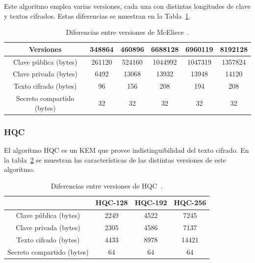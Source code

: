 Este algoritmo emplea varias versiones, cada una con distintas longitudes de clave y textos cifrados.
Estas diferencias se muestran en la Tabla~\ref{tab:mceliece}. 

\begin{table}[H]
    \centering
    \begin{tabular}{|c|c|c|c|c|c|}
    \hline
    Versiones                   & \textbf{348864}  & \textbf{460896}  & \textbf{6688128} & \textbf{6960119} & \textbf{8192128} \\ \hline
    Clave pública (bytes)       & 261120                    & 524160                    & 1044992                   & 1047319                   & 1357824                   \\ \hline
    Clave privada (bytes)       & 6492                      & 13068                     & 13932                     & 13948                     & 14120                     \\ \hline
    Texto cifrado (bytes)       & 96                        & 156                       & 208                       & 194                       & 208                       \\ \hline
    Secreto compartido (bytes)  & 32                        & 32                        & 32                        & 32                        & 32                        \\ \hline
    \end{tabular}
    \caption{Diferencias entre versiones de McEliece~\cite{mceliece_spec}.}
    \label{tab:mceliece}
\end{table}


\subsubsection{HQC}\label{subsubsec:hqc}

El algoritmo HQC es un \ac{KEM} que provee indistinguibilidad del texto cifrado.
En la tabla~\ref{tab:hqc} se muestran las características de las distintas versiones de este algoritmo.

\begin{table}[H]
    \centering
    \begin{tabular}{|c|c|c|c|}
    \hline
                                & \textbf{HQC-128}      & \textbf{HQC-192}      & \textbf{HQC-256}   \\ \hline
    Clave pública (bytes)       & 2249                  & 4522                  & 7245               \\ \hline
    Clave privada (bytes)       & 2305                  & 4586                  & 7137               \\ \hline
    Texto cifrado (bytes)       & 4433                  & 8978                  & 14421              \\ \hline
    Secreto compartido (bytes)  & 64                    & 64                    & 64                 \\ \hline
    \end{tabular}
    \caption{Diferencias entre versiones de HQC~\cite{hqc_spec}.}
    \label{tab:hqc}
\end{table}

